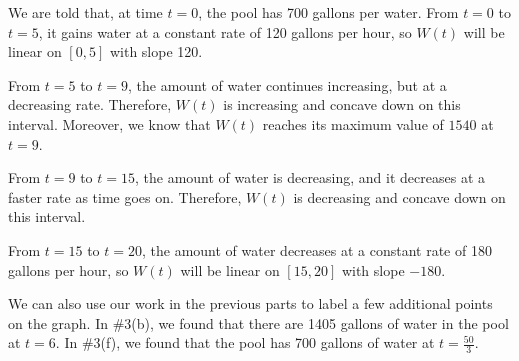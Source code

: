 \documentclass[main]{subfiles}
\begin{document}
\begin{enumerate}[resume]
\begin{enumerate}
    \begin{solution}
      We are told that, at time $t = 0$, the pool has 700 gallons per
      water.  From $t = 0$ to $t = 5$, it gains water at a constant rate
      of 120 gallons per hour, so $W(t)$ will be linear on $[0, 5]$ with
      slope 120.

      From $t = 5$ to $t = 9$, the amount of water continues increasing,
      but at a decreasing rate.  Therefore, $W(t)$ is increasing and
      concave down on this interval.  Moreover, we know that $W(t)$
      reaches its maximum value of $1540$ at $t = 9$.

      From $t = 9$ to $t = 15$, the amount of water is decreasing, and it
      decreases at a faster rate as time goes on.  Therefore, $W(t)$ is
      decreasing and concave down on this interval.

      From $t = 15$ to $t = 20$, the amount of water decreases at a
      constant rate of 180 gallons per hour, so $W(t)$ will be linear on
      $[15, 20]$ with slope $-180$.

      We can also use our work in the previous parts to label a few
      additional points on the graph.  In
      {{{{\#3}}(b)}}, we found that
      there are 1405 gallons of water in the pool at $t = 6$.  In
      {{{{\#3}}(f)}}, we found that the pool has
      700 gallons of water at $t = \frac{50}{3}$.  


\end{solution}
\end{enumerate}
\end{enumerate}
\end{document}
